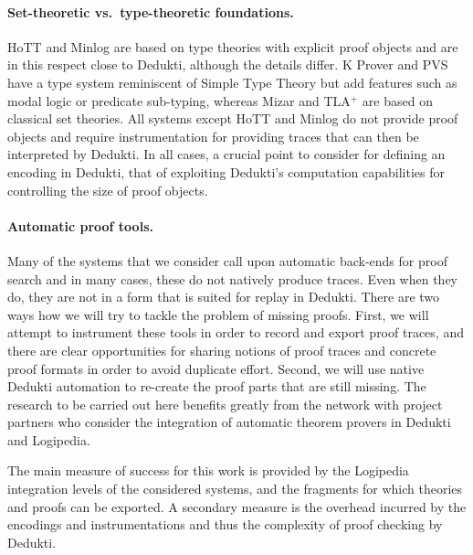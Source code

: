 \paragraph*{Set-theoretic vs.\ type-theoretic foundations.}
HoTT and Minlog are based on type theories with explicit proof objects and are
in this respect close to Dedukti, although the details differ. K Prover
and PVS have a type system reminiscent of Simple Type Theory but add features
such as modal logic or predicate sub-typing, whereas Mizar and TLA$^+$ are based
on classical set theories. All systems except HoTT and Minlog do not provide
proof objects and require instrumentation for providing traces that can then be
interpreted by Dedukti. In all cases, a crucial point to consider for defining
an encoding in Dedukti, that of exploiting
Dedukti's computation capabilities for controlling the size of proof objects.

\paragraph*{Automatic proof tools.}
Many of the systems that we consider call upon automatic back-ends for proof
search and in many cases, these do not natively produce traces. Even
when they do, they are not in a form that is suited for replay in
Dedukti. There are two ways how we will try to tackle the problem of
missing proofs. First, we will attempt to instrument these tools in
order to record and export proof traces, and there are clear
opportunities for sharing notions of proof traces and concrete proof
formats in order to avoid duplicate effort. Second, we will use native
Dedukti automation to re-create the proof parts that are still missing.
The research to be carried out here benefits greatly from the network with
project partners who consider the integration of automatic theorem provers in
Dedukti and Logipedia.

The main measure of success for this work is provided by the Logipedia
integration levels of the considered systems, and the fragments for which
theories and proofs can be exported. A secondary measure is the overhead
incurred by the encodings and instrumentations and thus the complexity of proof
checking by Dedukti.


